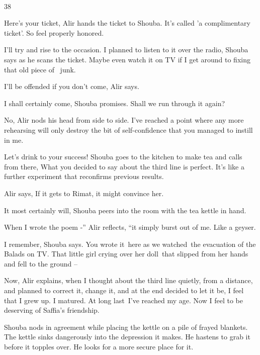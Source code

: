 \documentclass[12pt]{book}
\begin{document}
~

38

{\textquotedbl}Here's your ticket,{\textquotedbl} Alir hands the ticket to Shouba. {\textquotedbl}It's called 'a
complimentary ticket'. So feel properly honored.{\textquotedbl}

{\textquotedbl}I'll try and rise to the occasion. I planned to listen to it over the radio,{\textquotedbl} Shouba says
as he scans the ticket. {\textquotedbl}Maybe even watch it on TV if I get around to fixing that old piece of
~junk.{\textquotedbl}

{\textquotedbl}I'll be offended if you don't come,{\textquotedbl} Alir says.

{\textquotedbl}I shall certainly come,{\textquotedbl} Shouba promises. {\textquotedbl}Shall we run through it
again?{\textquotedbl}

{\textquotedbl}No,{\textquotedbl} Alir nods his head from side to side. {\textquotedbl}I've reached a point where any
more rehearsing will only destroy the bit of self-confidence that you managed to instill in me.{\textquotedbl}

{\textquotedbl}Let's drink to your success!{\textquotedbl} Shouba goes to the kitchen to make tea and calls from there,
{\textquotedbl}What you decided to say about the third line is perfect. It's like a further experiment that reconfirms
previous results.{\textquotedbl}

Alir says, {\textquotedbl}If it gets to Rimat, it might convince her.{\textquotedbl}

{\textquotedbl}It most certainly will,{\textquotedbl} Shouba peers into the room with the tea kettle in hand.

{\textquotedbl}When I wrote the poem -'' Alir reflects, ``it simply burst out of me. Like a geyser.{\textquotedbl}

{\textquotedbl}I remember,{\textquotedbl} Shouba says. {\textquotedbl}You wrote it~here as we watched~the evacuation of
the Balads on TV. That little girl crying over her doll~that slipped from her hands and fell to the ground
--{\textquotedbl}

{\textquotedbl}Now,{\textquotedbl} Alir explains, {\textquotedbl}when I thought about the third line quietly, from a
distance, and planned to correct it, change it, and at the end decided to let it be, I feel that I grew up. I matured.
At long last~I've reached my age. Now I feel to be deserving of Saffia's friendship.{\textquotedbl}

Shouba nods in agreement while placing the kettle on a pile of frayed blankets. The kettle sinks dangerously into the
depression it makes. He hastens to grab it before it topples over. He looks for a more secure place for it.
\end{document}
